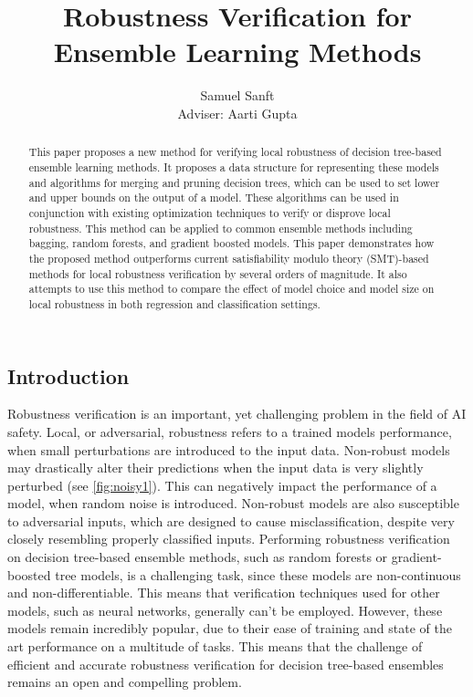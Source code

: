 \documentclass[pageno]{jpaper}
\begin{document}
\title{
Robustness Verification for Ensemble Learning Methods
}
\author{Samuel Sanft\\Adviser: Aarti Gupta}
\date{}
\maketitle

\begin{doublespacing}

\begin{abstract}
This paper proposes a new method for verifying local robustness of decision tree-based ensemble learning methods. It proposes a data structure for representing these models and algorithms for merging and pruning decision trees, which can be used to set lower and upper bounds on the output of a model. These algorithms can be used in conjunction with existing optimization techniques to verify or disprove local robustness. This method can be applied to common ensemble methods including bagging, random forests, and gradient boosted models. This paper demonstrates how the proposed method outperforms current satisfiability modulo theory (SMT)-based methods for local robustness verification by several orders of magnitude. It also attempts to use this method to compare the effect of model choice and model size on local robustness in both regression and classification settings.
\end{abstract}

\section{Introduction}
Robustness verification is an important, yet challenging problem in the field of AI safety. Local, or adversarial, robustness refers to a trained models performance, when small perturbations are introduced to the input data. Non-robust models may drastically alter their predictions when the input data is very slightly perturbed (see \autoref{fig:noisy1}). This can negatively impact the performance of a model, when random noise is introduced. Non-robust models are also susceptible to adversarial inputs, which are designed to cause misclassification, despite very closely resembling properly classified inputs. Performing robustness verification on decision tree-based ensemble methods, such as random forests or gradient-boosted tree models, is a challenging task, since these models are non-continuous and non-differentiable. This means that verification techniques used for other models, such as neural networks, generally can't be employed. However, these models remain incredibly popular, due to their ease of training and state of the art performance on a multitude of tasks. This means that the challenge of efficient and accurate robustness verification for decision tree-based ensembles remains an open and compelling problem.


\end{doublespacing}
\end{document}
